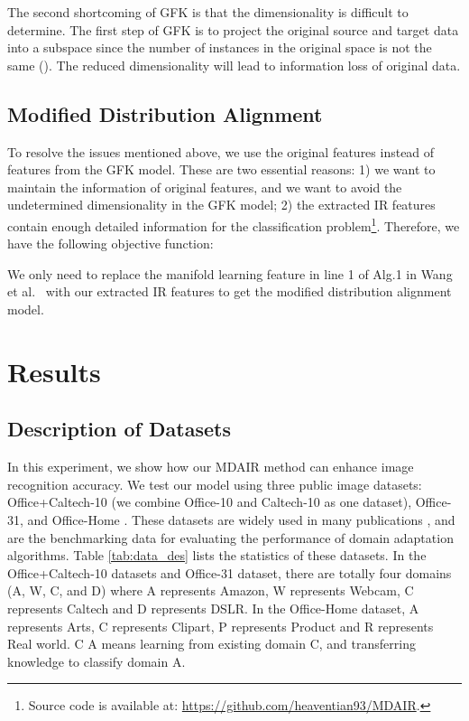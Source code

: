 \documentclass[10pt, conference, compsocconf]{IEEEtran}
\begin{document}
The second shortcoming of GFK is that the dimensionality is difficult to determine. The first step of GFK is to project the original source and target data into a subspace since the number of instances in the original space is not the same (). The reduced dimensionality will lead to information loss of original data.

\subsection{Modified Distribution Alignment}
To resolve the issues mentioned above, we use the original features instead of features from the GFK model. These are two essential reasons: 1) we want to maintain the information of original features, and we want to avoid the undetermined dimensionality in the GFK model; 2) the extracted IR features contain enough detailed information for the classification problem\footnote{Source code is available at: \url{https://github.com/heaventian93/MDAIR}.}.
Therefore, we have the following objective function:


We only need to replace the manifold learning feature  in line 1 of Alg.1 in Wang et al.~\cite{wang2018visual} with our extracted IR features to get the modified distribution alignment model.





\section{Results}

\subsection{Description of Datasets}
In this experiment, we show how our MDAIR method can enhance image recognition accuracy. We test our model using three public image datasets:  Office+Caltech-10 (we combine Office-10 and Caltech-10 as one dataset), Office-31, and Office-Home  \cite{saenko2010adapting,wang2018visual,rahman2019minimum}. These datasets are widely used in many publications \cite{gopalan2011domain,gong2012geodesic,wang2018visual}, and are the benchmarking data for evaluating the performance of domain adaptation algorithms. Table \ref{tab:data_des} lists the statistics of these datasets.
In the Office+Caltech-10 datasets and Office-31 dataset, there are totally four domains (A, W, C, and D) where A represents Amazon, W represents Webcam, C represents Caltech and D represents DSLR. In the Office-Home dataset, A represents Arts, C represents Clipart, P represents Product and R represents Real world.
C  A  means learning from existing domain C, and transferring knowledge to classify domain A. 
\end{document}
